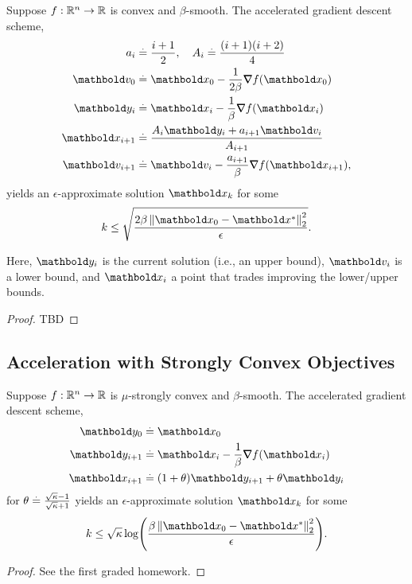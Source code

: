 \begin{thm} Suppose $f: \mathbb{R}^n \to \mathbb{R}$ is convex and $\beta$-smooth. The accelerated gradient descent scheme, \begin{align}\begin{split}
    a_i &\defeq \frac{i+1}{2}, \quad A_i \defeq \frac{(i+1)(i+2)}{4} \\
    \vv_0 &\defeq \vx_0 - \frac{1}{2\beta} \grad f(\vx_0) \\
    \vy_i &\defeq \vx_i - \frac{1}{\beta} \grad f(\vx_i) \\
    \vx_{i+1} &\defeq \frac{A_i\vy_i + a_{i+1}\vv_i}{A_{i+1}} \\
    \vv_{i+1} &\defeq \vv_i - \frac{a_{i+1}}{\beta} \grad f(\vx_{i+1}),
\end{split}\end{align} yields an $\epsilon$-approximate solution $\vx_k$ for some \begin{align*}
    k \leq \sqrt{\frac{2\beta\norm{\vx_0 - \s{\vx}}_2^2}{\epsilon}}.
\end{align*}
\end{thm} Here, $\vy_i$ is the current solution (i.e., an upper bound), $\vv_i$ is a lower bound, and $\vx_i$ a point that trades improving the lower/upper bounds.

\begin{proof}
TBD
\end{proof}

\subsection{Acceleration with Strongly Convex Objectives}

\begin{thm} Suppose $f: \mathbb{R}^n \to \mathbb{R}$ is $\mu$-strongly convex and $\beta$-smooth. The accelerated gradient descent scheme, \begin{align}\begin{split}
    \vy_0 &\defeq \vx_0 \\
    \vy_{i+1} &\defeq \vx_i - \frac{1}{\beta} \grad f(\vx_i) \\
    \vx_{i+1} &\defeq (1+\theta)\vy_{i+1} + \theta\vy_i
\end{split}\end{align} for $\theta \overset{.}{=} \frac{\sqrt{\kappa} - 1}{\sqrt{\kappa} + 1}$ yields an $\epsilon$-approximate solution $\vx_k$ for some \begin{align*}
    k \leq \sqrt{\kappa}\log\parentheses*{\frac{\beta\norm{\vx_0 - \s{\vx}}_2^2}{\epsilon}}.
\end{align*}
\end{thm}
\begin{proof}
See the first graded homework.
\end{proof}

